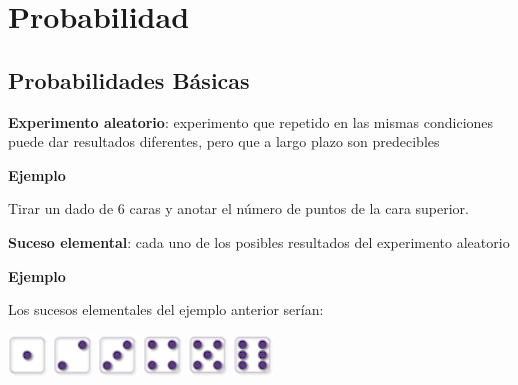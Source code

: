 \documentclass[]{book}
\begin{document}
\hypertarget{probabilidad}{%
\chapter{Probabilidad}\label{probabilidad}}

\hypertarget{probabilidades-buxe1sicas}{%
\section{Probabilidades Básicas}\label{probabilidades-buxe1sicas}}

 \textbf{Experimento aleatorio}: experimento que repetido en las mismas condiciones puede dar resultados diferentes, pero que a largo plazo son predecibles

\textbf{Ejemplo}

Tirar un dado de 6 caras y anotar el número de puntos de la cara superior.

\textbf{Suceso elemental}: cada uno de los posibles resultados del experimento aleatorio

\textbf{Ejemplo}

Los sucesos elementales del ejemplo anterior serían:

\includegraphics[width=0.42in]{Images/proba1dibujos/dice/1}
\includegraphics[width=0.42in]{Images/proba1dibujos/dice/2}
\includegraphics[width=0.42in]{Images/proba1dibujos/dice/3}
\includegraphics[width=0.42in]{Images/proba1dibujos/dice/4}
\includegraphics[width=0.42in]{Images/proba1dibujos/dice/5}
\includegraphics[width=0.42in]{Images/proba1dibujos/dice/6}
\end{document}
